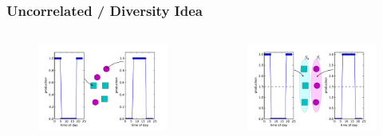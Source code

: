 \documentclass[xcolor=dvipsnames]{beamer}
\begin{document}
%
%
\begin{frame}
	\frametitle{Uncorrelated / Diversity Idea}

	\begin{columns}
		\begin{column}{.5 \linewidth}
			\begin{figure}
				\includegraphics[scale=.4]{rond_carre_1.pdf}
			\end{figure}
		\end{column}
		\begin{column}{.5 \linewidth}
			\begin{figure}
				\includegraphics[scale=.35]{rond_carre_2.pdf}
			\end{figure}
			\begin{figure}

\end{figure}
\end{column}
\end{columns}
\end{frame}
\end{document}
